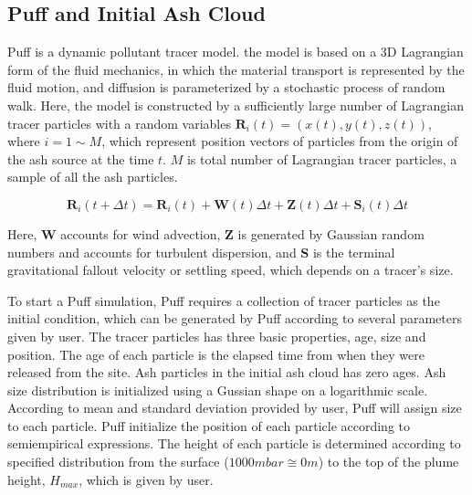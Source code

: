 \documentclass[utf8]{frontiersSCNS} %
\begin{document}
\subsection{Puff and Initial Ash Cloud} \label{sec:puff-model}
 Puff \citep{tanaka1991development,searcy1998puff} is a dynamic pollutant tracer model. the model is based on a 3D Lagrangian form of the fluid mechanics, in which the material transport is represented by the fluid motion, and diffusion is parameterized by a stochastic process of random walk. Here, the model is constructed by a sufficiently large number of  Lagrangian tracer particles with a random variables $\textbf{R}_i(t) = (x(t),y(t),z(t))$, where $ i = 1 \sim M$, which represent position vectors of particles from the origin of the ash source at the time $t$. $M$ is total number of  Lagrangian tracer particles,  a sample of all the ash particles. 
\begin{linenomath*}
\begin{equation}
\textbf{R}_i(t+\Delta t) = \textbf{R}_i(t) + \textbf{W}(t)\Delta t + \textbf{Z}(t)\Delta t + \textbf{S}_i(t) \Delta t
\end{equation}
\end{linenomath*}
Here, $\textbf{W}$ accounts for wind advection, $\textbf{Z}$  is generated by Gaussian random numbers and accounts for turbulent dispersion, and $\textbf{S}$ is the terminal gravitational fallout velocity or settling speed, which depends on a tracer's size.

To start a Puff simulation, Puff requires a collection of tracer particles as the initial condition, which can be generated by Puff according to several parameters given by user. The tracer particles has three basic properties, age, size and position. The age of each particle is the elapsed time from when they were released from the site. Ash particles in the initial ash cloud has zero ages. Ash size distribution is initialized using a Gussian shape on a logarithmic scale. According to mean and standard deviation provided by user, Puff will assign size to each particle. Puff initialize the position of each particle according to semiempirical expressions. The height of each particle is determined according to specified distribution from the surface ($1000 mbar \cong 0 m$) to the top of the plume height, $H_{max}$, which is given by user.
\end{document}
